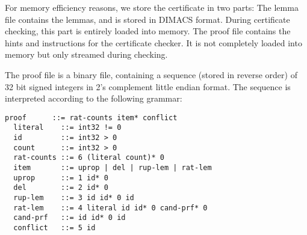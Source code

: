 \documentclass[conference]{IEEEtran}
\begin{document}
For memory efficiency reasons, we store the certificate in two parts: The lemma file contains the lemmas, and is stored in DIMACS format.
During certificate checking, this part is entirely loaded into memory.
The proof file contains the hints and instructions for the certificate checker. It is not completely loaded into memory but only streamed during checking.

The proof file is a binary file, containing a sequence (stored in reverse order) of 32 bit signed integers in 2's complement little endian format.
The sequence is interpreted according to the following grammar:
\begin{lstlisting}[language={},columns={[c]fullflexible},literate={}]
  proof      ::= rat-counts item* conflict
  literal    ::= int32 != 0
  id         ::= int32 > 0
  count      ::= int32 > 0
  rat-counts ::= 6 (literal count)* 0
  item       ::= uprop | del | rup-lem | rat-lem
  uprop      ::= 1 id* 0
  del        ::= 2 id* 0
  rup-lem    ::= 3 id id* 0 id
  rat-lem    ::= 4 literal id id* 0 cand-prf* 0
  cand-prf   ::= id id* 0 id
  conflict   ::= 5 id
\end{lstlisting}
\end{document}
